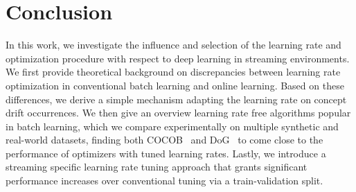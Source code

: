 \documentclass[letterpaper]{article} %
\begin{document}




\section{Conclusion}

In this work, we investigate the influence and selection of the learning rate and optimization procedure with respect to deep learning in streaming environments.
We first provide theoretical background on discrepancies between learning rate optimization in conventional batch learning and online learning.
Based on these differences, we derive a simple mechanism adapting the learning rate on concept drift occurrences.
We then give an overview learning rate free algorithms popular in batch learning, which we compare experimentally on multiple synthetic and real-world datasets,
finding both COCOB~\cite{orabonaTrainingDeepNetworks2017} and DoG~\cite{ivgiDoGSGDBest2023} to come close to the performance of optimizers with tuned learning rates.
Lastly, we introduce a streaming specific learning rate tuning approach that grants significant performance increases over conventional tuning via a train-validation split.






\appendix
\end{document}
